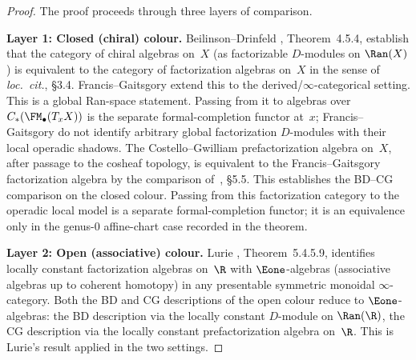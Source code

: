 \begin{proof}
The proof proceeds through three layers of comparison.

\medskip\noindent
\textbf{Layer 1: Closed (chiral) colour.}
Beilinson--Drinfeld \cite{BD04}, Theorem~4.5.4, establish that
the category of chiral algebras on~$X$ (as factorizable
$D$-modules on $\Ran(X)$) is equivalent to the category of
factorization algebras on~$X$ in the sense of \emph{loc.\ cit.},
\S3.4. Francis--Gaitsgory \cite{FG12} extend this to the
derived/$\infty$-categorical setting. This is a global Ran-space
statement. Passing from it to algebras over
$C_\ast(\FM_\bullet(T_xX))$ is the separate formal-completion
functor at~$x$; Francis--Gaitsgory do not identify arbitrary global
factorization $D$-modules with their local operadic shadows. The
Costello--Gwilliam prefactorization algebra on~$X$, after
passage to the cosheaf topology, is equivalent to the
Francis--Gaitsgory factorization algebra by the comparison
of~\cite{CG17}, \S5.5. This establishes the BD--CG comparison on
the closed colour. Passing from this factorization category to the
operadic local model is a separate formal-completion functor; it is an
equivalence only in the genus-$0$ affine-chart case recorded in the
theorem.

\medskip\noindent
\textbf{Layer 2: Open (associative) colour.}
Lurie \cite{HA}, Theorem~5.4.5.9, identifies locally
constant factorization algebras on~$\R$ with $\Eone$-algebras
(associative algebras up to coherent homotopy) in any presentable
symmetric monoidal $\infty$-category. Both the BD and CG
descriptions of the open colour reduce to $\Eone$-algebras:
the BD description via the locally constant $D$-module on
$\Ran(\R)$, the CG description via the locally constant
prefactorization algebra on~$\R$. This is Lurie's result applied
in the two settings.


\end{proof}
